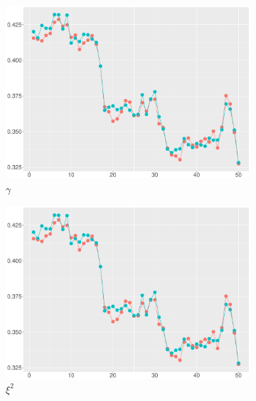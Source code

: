 \begin{figure}[h]
\centering
\begin{subfigure}[b]{0.45\textwidth}
\includegraphics[width=\textwidth]{Chapters/05MCMCOU/plots/realdatacomparegambatchwindow2.pdf}
	\caption{$\gamma$}
\end{subfigure}
\begin{subfigure}[b]{0.45\textwidth}
\includegraphics[width=\textwidth]{Chapters/05MCMCOU/plots/realdatacomparexi2batchwindow2.pdf}
	\caption{$\xi^2$}
\end{subfigure}
\begin{subfigure}[b]{0.45\textwidth}

\end{subfigure}
\end{figure}
